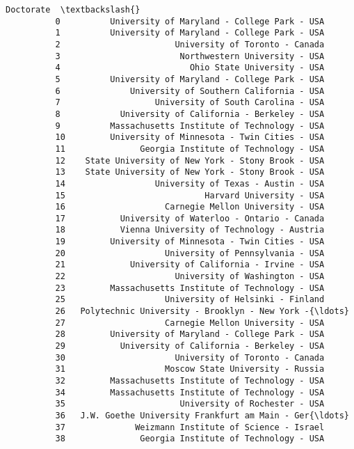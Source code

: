 \documentclass[11pt]{article}
\begin{document}
\begin{Verbatim}[commandchars=\\\{\}]
                                                       Doctorate  \textbackslash{}
          0          University of Maryland - College Park - USA   
          1          University of Maryland - College Park - USA   
          2                       University of Toronto - Canada   
          3                        Northwestern University - USA   
          4                          Ohio State University - USA   
          5          University of Maryland - College Park - USA   
          6              University of Southern California - USA   
          7                   University of South Carolina - USA   
          8            University of California - Berkeley - USA   
          9          Massachusetts Institute of Technology - USA   
          10         University of Minnesota - Twin Cities - USA   
          11               Georgia Institute of Technology - USA   
          12    State University of New York - Stony Brook - USA   
          13    State University of New York - Stony Brook - USA   
          14                  University of Texas - Austin - USA   
          15                            Harvard University - USA   
          16                    Carnegie Mellon University - USA   
          17           University of Waterloo - Ontario - Canada   
          18           Vienna University of Technology - Austria   
          19         University of Minnesota - Twin Cities - USA   
          20                    University of Pennsylvania - USA   
          21             University of California - Irvine - USA   
          22                      University of Washington - USA   
          23         Massachusetts Institute of Technology - USA   
          25                    University of Helsinki - Finland   
          26   Polytechnic University - Brooklyn - New York -{\ldots}   
          27                    Carnegie Mellon University - USA   
          28         University of Maryland - College Park - USA   
          29           University of California - Berkeley - USA   
          30                      University of Toronto - Canada   
          31                    Moscow State University - Russia   
          32         Massachusetts Institute of Technology - USA   
          34         Massachusetts Institute of Technology - USA   
          35                       University of Rochester - USA   
          36   J.W. Goethe University Frankfurt am Main - Ger{\ldots}   
          37              Weizmann Institute of Science - Israel   
          38               Georgia Institute of Technology - USA   

\end{Verbatim}
\end{document}
